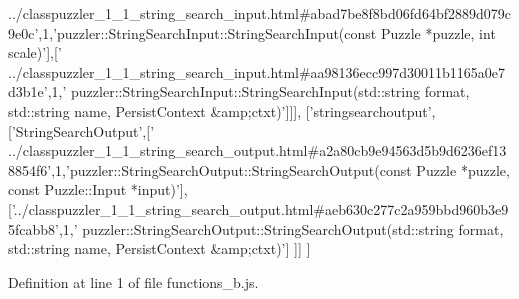\begin{DoxyCode}
{      ../classpuzzler\_1\_1\_string\_search\_input.html#abad7be8f8bd06fd64bf2889d079c9e0c'},1,\textcolor{stringliteral}{'puzzler::StringSearchInput::StringSearchInput(const Puzzle *puzzle, int scale)'}],[\textcolor{stringliteral}{'
      ../classpuzzler\_1\_1\_string\_search\_input.html#aa98136ecc997d30011b1165a0e7d3b1e'},1,\textcolor{stringliteral}{'
      puzzler::StringSearchInput::StringSearchInput(std::string format, std::string name, PersistContext &amp;ctxt)'}]]],
  [\textcolor{stringliteral}{'stringsearchoutput'},[\textcolor{stringliteral}{'StringSearchOutput'},[\textcolor{stringliteral}{'
      ../classpuzzler\_1\_1\_string\_search\_output.html#a2a80cb9e94563d5b9d6236ef138854f6'},1,\textcolor{stringliteral}{'puzzler::StringSearchOutput::StringSearchOutput(const Puzzle *puzzle, const
       Puzzle::Input *input)'}],[\textcolor{stringliteral}{'../classpuzzler\_1\_1\_string\_search\_output.html#aeb630c277c2a959bbd960b3e95fcabb8'},1,\textcolor{stringliteral}{'
      puzzler::StringSearchOutput::StringSearchOutput(std::string format, std::string name, PersistContext &amp;ctxt)'}]
      ]]
]
\end{DoxyCode}


Definition at line 1 of file functions\+\_\+b.\+js.

